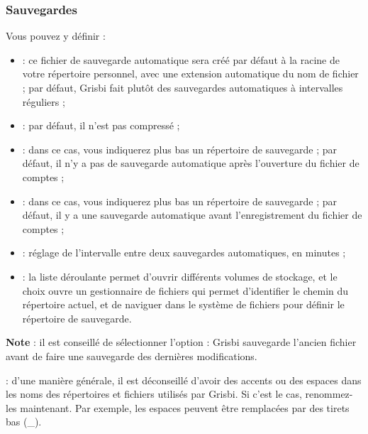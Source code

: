 \subsubsection{Sauvegardes\label{setup-general-files-backup}}

Vous pouvez y définir :

\begin{itemize}
	\item {} : ce fichier de sauvegarde automatique sera créé par défaut à la racine de votre répertoire personnel, avec une extension automatique du nom de fichier ; par défaut, Grisbi fait plutôt des sauvegardes automatiques à intervalles réguliers ;
	\item {} : par défaut, il n'est pas compressé ;
	\item {} : dans ce cas, vous indiquerez plus bas un répertoire de sauvegarde ; par défaut, il n'y a pas de sauvegarde automatique après l'ouverture du fichier de comptes ;
	\item {} : dans ce cas, vous indiquerez plus bas un répertoire de sauvegarde ; par défaut, il y a une sauvegarde automatique avant l'enregistrement du fichier de comptes ;
	\item {} : réglage de l'intervalle entre deux sauvegardes automatiques, en minutes ;
	\item {} : la liste déroulante permet d'ouvrir différents volumes de stockage, et le choix  ouvre un gestionnaire de fichiers qui permet d'identifier le chemin du répertoire actuel, et de naviguer dans le système de fichiers pour définir le répertoire de sauvegarde.
\end{itemize}

\textbf{Note} : il est conseillé de sélectionner l'option  : Grisbi sauvegarde l'ancien fichier avant de faire une sauvegarde des dernières modifications.

 : d'une manière générale, il est déconseillé d'avoir des accents ou des espaces dans les noms des répertoires et fichiers utilisés par Grisbi. Si c'est le cas, renommez-les maintenant. Par exemple, les espaces peuvent être remplacées par des tirets bas (\_). 


